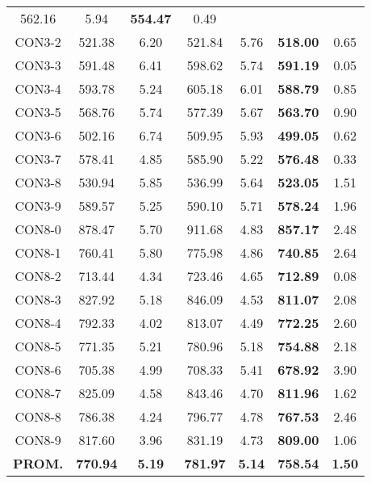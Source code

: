 \begin{table}[ht]
\begin{tabular}{c c c c c c c}
562.16 & 5.94 & \bf{554.47} & 
0.49\\CON3-2 & 521.38 & 6.20 & 
521.84 & 5.76 & \bf{518.00} & 
0.65\\CON3-3 & 591.48 & 6.41 & 
598.62 & 5.74 & \bf{591.19} & 
0.05\\CON3-4 & 593.78 & 5.24 & 
605.18 & 6.01 & \bf{588.79} & 
0.85\\CON3-5 & 568.76 & 5.74 & 
577.39 & 5.67 & \bf{563.70} & 
0.90\\CON3-6 & 502.16 & 6.74 & 
509.95 & 5.93 & \bf{499.05} & 
0.62\\CON3-7 & 578.41 & 4.85 & 
585.90 & 5.22 & \bf{576.48} & 
0.33\\CON3-8 & 530.94 & 5.85 & 
536.99 & 5.64 & \bf{523.05} & 
1.51\\CON3-9 & 589.57 & 5.25 & 
590.10 & 5.71 & \bf{578.24} & 
1.96\\CON8-0 & 878.47 & 5.70 & 
911.68 & 4.83 & \bf{857.17} & 
2.48\\CON8-1 & 760.41 & 5.80 & 
775.98 & 4.86 & \bf{740.85} & 
2.64\\CON8-2 & 713.44 & 4.34 & 
723.46 & 4.65 & \bf{712.89} & 
0.08\\CON8-3 & 827.92 & 5.18 & 
846.09 & 4.53 & \bf{811.07} & 
2.08\\CON8-4 & 792.33 & 4.02 & 
813.07 & 4.49 & \bf{772.25} & 
2.60\\CON8-5 & 771.35 & 5.21 & 
780.96 & 5.18 & \bf{754.88} & 
2.18\\CON8-6 & 705.38 & 4.99 & 
708.33 & 5.41 & \bf{678.92} & 
3.90\\CON8-7 & 825.09 & 4.58 & 
843.46 & 4.70 & \bf{811.96} & 
1.62\\CON8-8 & 786.38 & 4.24 & 
796.77 & 4.78 & \bf{767.53} & 
2.46\\CON8-9 & 817.60 & 3.96 & 
831.19 & 4.73 & \bf{809.00} & 
1.06\\\bf{PROM.} & 
\bf{770.94} & \bf{5.19} & \bf{781.97} & \bf{5.14} & \bf{758.54} & \bf{1.50}\\[1ex]\hline
\end{tabular}
\label{table:nonlin}
\end{table} \clearpage
